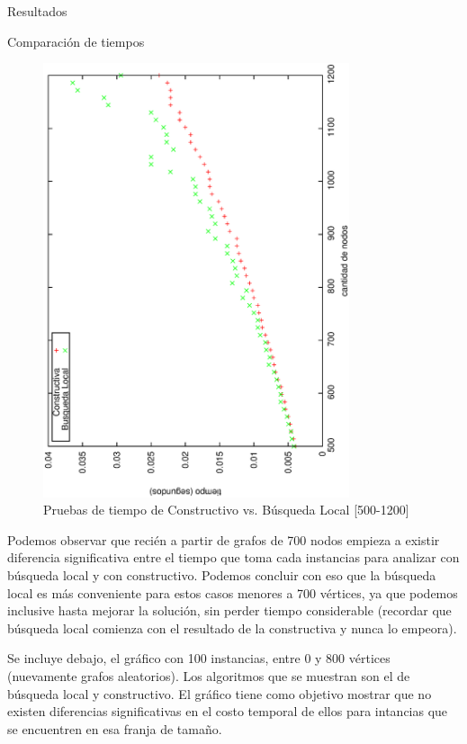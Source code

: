 \documentclass[12pt,titlepage]{article}
\newcommand{\VSP}{\vspace*{3em}}
\begin{document}
\begin{section}{Resultados}
\begin{subsection}{Comparación de tiempos}
		\begin{figure}[H]
			\centering
					\includegraphics[width=9cm,angle=-90]{conclusiones/heuris_rapidas2.eps}
			\caption{Pruebas de tiempo de Constructivo vs. Búsqueda Local [500-1200]}
			\label{fig:Tiempo de const_bus_loc}
		\end{figure}
		
		Podemos observar que recién a partir de grafos de 700 nodos empieza a existir diferencia significativa entre el tiempo que toma cada instancias para analizar con búsqueda local y con constructivo. Podemos concluir con eso que la búsqueda local es más conveniente para estos casos menores a 700 vértices, ya que podemos inclusive hasta mejorar la solución, sin perder tiempo considerable (recordar que búsqueda local comienza con el resultado de la constructiva y nunca lo empeora).\VSP
		
		Se incluye debajo, el gráfico con 100 instancias, entre 0 y 800 vértices (nuevamente grafos aleatorios). Los algoritmos que se muestran son el de búsqueda local y constructivo. El gráfico tiene como objetivo mostrar que no existen diferencias significativas en el costo temporal de ellos para intancias que se encuentren en esa franja de tamaño.
		

\end{subsection}
\end{section}
\end{document}
